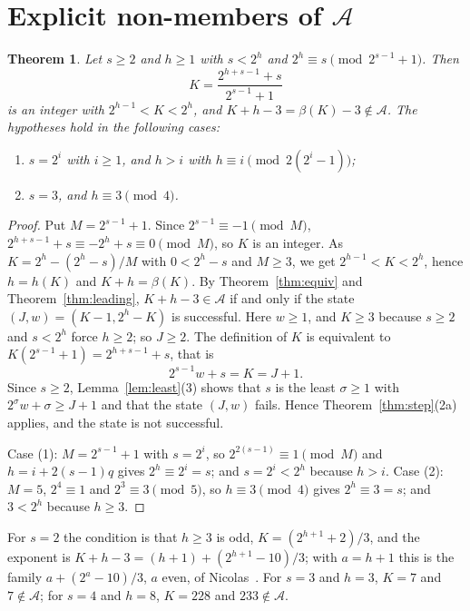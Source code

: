 \documentclass[11pt]{amsart}
\newtheorem{Theorem}{Theorem}[section]
\theoremstyle{definition}
\begin{document}
\section{Explicit non-members of $\mathcal{A}$}
\label{sec:nonmembers}
\begin{Theorem}
\label{thm:nonmembers}
Let $s\ge2$ and $h\ge1$ with $s<2^h$ and $2^h\equiv s\pmod{2^{s-1}+1}$. Then
\begin{equation}
\label{eq:Knon}
K=\frac{2^{h+s-1}+s}{2^{s-1}+1}
\end{equation}
is an integer with $2^{h-1}<K<2^h$, and $K+h-3=\beta(K)-3\notin\mathcal{A}$. The hypotheses hold in the following cases:
\begin{enumerate}
\item $s=2^i$ with $i\ge1$, and $h>i$ with $h\equiv i\pmod{2(2^i-1)}$;
\item $s=3$, and $h\equiv3\pmod4$.
\end{enumerate}
\end{Theorem}
\begin{proof}
Put $M=2^{s-1}+1$. Since $2^{s-1}\equiv-1\pmod M$, $2^{h+s-1}+s\equiv-2^h+s\equiv0\pmod M$, so $K$ is an integer. As $K=2^h-(2^h-s)/M$ with $0<2^h-s$ and $M\ge3$, we get $2^{h-1}<K<2^h$, hence $h=h(K)$ and $K+h=\beta(K)$. By Theorem~\ref{thm:equiv} and Theorem~\ref{thm:leading}, $K+h-3\in\mathcal{A}$ if and only if the state $(J,w)=(K-1,2^h-K)$ is successful. Here $w\ge1$, and $K\ge3$ because $s\ge2$ and $s<2^h$ force $h\ge2$; so $J\ge2$. The definition of $K$ is equivalent to $K(2^{s-1}+1)=2^{h+s-1}+s$, that is
\[
2^{s-1}w+s=K=J+1.
\]
Since $s\ge2$, Lemma~\ref{lem:least}(3) shows that $s$ is the least $\sigma\ge1$ with $2^\sigma w+\sigma\ge J+1$ and that the state $(J,w)$ fails. Hence Theorem~\ref{thm:step}(2a) applies, and the state is not successful.

Case (1): $M=2^{s-1}+1$ with $s=2^i$, so $2^{2(s-1)}\equiv1\pmod M$ and $h=i+2(s-1)q$ gives $2^h\equiv2^i=s$; and $s=2^i<2^h$ because $h>i$. Case (2): $M=5$, $2^4\equiv1$ and $2^3\equiv3\pmod5$, so $h\equiv3\pmod4$ gives $2^h\equiv3=s$; and $3<2^h$ because $h\ge3$.
\end{proof}

For $s=2$ the condition is that $h\ge3$ is odd, $K=(2^{h+1}+2)/3$, and the exponent is $K+h-3=(h+1)+(2^{h+1}-10)/3$; with $a=h+1$ this is the family $a+(2^a-10)/3$, $a$ even, of Nicolas~\cite{nicolas2005open}. For $s=3$ and $h=3$, $K=7$ and $7\notin\mathcal{A}$; for $s=4$ and $h=8$, $K=228$ and $233\notin\mathcal{A}$.
\end{document}
